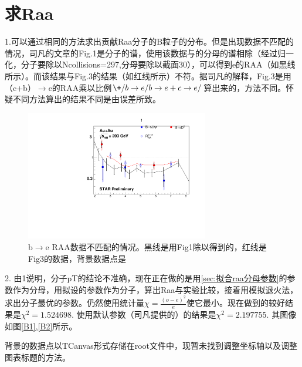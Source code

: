 \documentclass{ctexart}
\begin{document}

\section{求Raa} %
\label{sec:求raa}

1.可以通过相同的方法求出贡献Raa分子的B粒子的分布。但是出现数据不匹配的情况，司凡的文章\cite{SI2020135465}的Fig.1是分子的谱，使用该数据与\cite{Aidala:2019hib}的分母的谱相除（经过归一化，分子要除以Ncollisions=297,分母要除以截面30），可以得到e的RAA（如黑线所示）。而该结果与\cite{SI2020135465}Fig.3的结果（如红线所示）不符。据司凡的解释，Fig.3是用（c+b）$\to$e的RAA乘以比例$\+/b\to e/b\to e+c\to e/$算出来的，方法不同。怀疑不同方法算出的结果不同是由误差所致。
\begin{figure}\centering
	\includegraphics[width=8cm]{src/r.pdf}
	\caption{b$\to$e RAA数据不匹配的情况。黑线是用\cite{SI2020135465}Fig1除以\cite{Aidala:2019hib}得到的，红线是\cite{SI2020135465}Fig3的数据，背景数据点是\cite{Tang:2020ame}}
	\label{b2e}
\end{figure}
2. 由1说明，\cite{SI2020135465}分子pT的结论不准确，现在正在做的是用\ref{sec:拟合raa分母参数}的参数作为分母，用拟设的参数作为分子，算出Raa与实验\cite{Tang:2020ame}比较，接着用模拟退火法，求出分子最优的参数。仍然使用统计量$\displaystyle\chi=\frac{(o-e)^2}{e}$使它最小。现在做到的较好结果是$\chi^2=\num{1.524698}$. 使用默认参数（司凡提供的）的结果是$\chi^2=\num{2.197755}$. 其图像如图\ref{B1},\ref{B2}所示。
\begin{remark}
	背景的数据点以TCanvas形式存储在root文件中，现暂未找到调整坐标轴以及调整图表标题的方法。
\end{remark}
\end{document}
